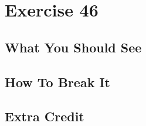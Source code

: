 \chapter{Exercise 46}


\section{What You Should See}


\section{How To Break It}


\section{Extra Credit}



